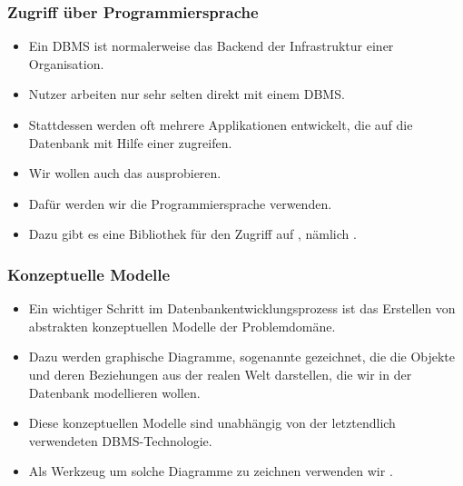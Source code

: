 \documentclass[aspectratio=169,mathserif,notheorems]{beamer}%
\begin{document}
%
\begin{frame}[b]%
\frametitle{Zugriff über Programmiersprache}%
\begin{itemize}%
\item Ein DBMS ist normalerweise das Backend der Infrastruktur einer Organisation.%
\item<2-> Nutzer arbeiten nur sehr selten direkt mit einem DBMS.%
\item<3-> Stattdessen werden oft mehrere Applikationen entwickelt, die auf die Datenbank mit Hilfe einer  zugreifen.%
\item<4-> Wir wollen auch das ausprobieren.%
\item<5-> Dafür werden wir die Programmiersprache \python\cite{K2018EIPFEUU,A2002PC,H2023ABGTP3P,LH2015DSAAWP,programmingWithPython} verwenden.%
\item<6-> Dazu gibt es eine Bibliothek für den Zugriff auf \postgresql, nämlich \psycopg\cite{VDGE2010P}.%
\end{itemize}%
%
%
\end{frame}%
%
\begin{frame}[b]%
\frametitle{Konzeptuelle Modelle}%
\begin{itemize}%
\item Ein wichtiger Schritt im Datenbankentwicklungsprozess ist das Erstellen von abstrakten konzeptuellen Modelle der Problemdomäne.%
\item<2-> Dazu werden graphische Diagramme, sogenannte  gezeichnet, die die Objekte und deren Beziehungen aus der realen Welt darstellen, die wir in der Datenbank modellieren wollen.%
\item<3-> Diese konzeptuellen Modelle sind unabhängig von der letztendlich verwendeten DBMS-Technologie.%
\item<4-> Als Werkzeug um solche Diagramme zu zeichnen verwenden wir \yEd\cite{SG2015MDAWY,Y2011YGEM}.%
\end{itemize}%
%
\end{frame}%
\end{document}
